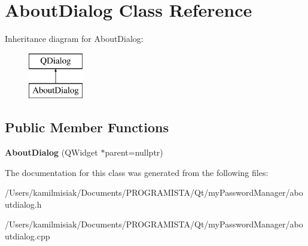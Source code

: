 \hypertarget{class_about_dialog}{}\section{About\+Dialog Class Reference}
\label{class_about_dialog}
Inheritance diagram for About\+Dialog\+:\begin{figure}[H]
\begin{center}
\leavevmode
\includegraphics[height=2.000000cm]{class_about_dialog}
\end{center}
\end{figure}
\subsection*{Public Member Functions}
\begin{DoxyCompactItemize}
\item 
\mbox{\label{class_about_dialog_a66647a6ddd09e3a000e96bd25a835799}} 
{\bfseries About\+Dialog} (Q\+Widget $\ast$parent=nullptr)
\end{DoxyCompactItemize}


The documentation for this class was generated from the following files\+:\begin{DoxyCompactItemize}
\item 
/\+Users/kamilmisiak/\+Documents/\+P\+R\+O\+G\+R\+A\+M\+I\+S\+T\+A/\+Qt/my\+Password\+Manager/aboutdialog.\+h\item 
/\+Users/kamilmisiak/\+Documents/\+P\+R\+O\+G\+R\+A\+M\+I\+S\+T\+A/\+Qt/my\+Password\+Manager/aboutdialog.\+cpp\end{DoxyCompactItemize}

